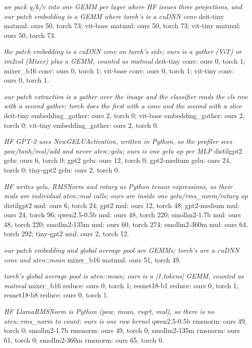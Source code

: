 \begin{minipage}{\linewidth}
\emph{we pack q/k/v into one GEMM per layer where HF issues three projections, and our patch embedding is a GEMM where torch's is a cuDNN conv} deit-tiny matmul: ours 50, torch 73; vit-base matmul: ours 50, torch 73; vit-tiny matmul: ours 50, torch 73.
\par\smallskip
\emph{the patch embedding is a cuDNN conv on torch's side; ours is a gather (ViT) or im2col (Mixer) plus a GEMM, counted as matmul} deit-tiny conv: ours 0, torch 1; mixer\_b16 conv: ours 0, torch 1; vit-base conv: ours 0, torch 1; vit-tiny conv: ours 0, torch 1.
\par\smallskip
\emph{our patch extraction is a gather over the image and the classifier reads the cls row with a second gather; torch does the first with a conv and the second with a slice} deit-tiny embedding\_gather: ours 2, torch 0; vit-base embedding\_gather: ours 2, torch 0; vit-tiny embedding\_gather: ours 2, torch 0.
\par\smallskip
\emph{HF GPT-2 uses NewGELUActivation, written in Python, so the profiler sees pow/tanh/mul/add and never aten::gelu; ours is one gelu op per MLP} distilgpt2 gelu: ours 6, torch 0; gpt2 gelu: ours 12, torch 0; gpt2-medium gelu: ours 24, torch 0; tiny-gpt2 gelu: ours 2, torch 0.
\par\smallskip
\emph{HF writes gelu, RMSNorm and rotary as Python tensor expressions, so their muls are individual aten::mul calls; ours are inside one gelu/rms\_norm/rotary op} distilgpt2 mul: ours 6, torch 24; gpt2 mul: ours 12, torch 48; gpt2-medium mul: ours 24, torch 96; qwen2.5-0.5b mul: ours 48, torch 220; smollm2-1.7b mul: ours 48, torch 220; smollm2-135m mul: ours 60, torch 274; smollm2-360m mul: ours 64, torch 292; tiny-gpt2 mul: ours 2, torch 12.
\par\smallskip
\emph{our patch embedding and global average pool are GEMMs; torch's are a cuDNN conv and aten::mean} mixer\_b16 matmul: ours 51, torch 49.
\par\smallskip
\emph{torch's global average pool is aten::mean; ours is a [1,tokens] GEMM, counted as matmul} mixer\_b16 reduce: ours 0, torch 1; resnet18-b1 reduce: ours 0, torch 1; resnet18-b8 reduce: ours 0, torch 1.
\par\smallskip
\emph{HF LlamaRMSNorm is Python (pow, mean, rsqrt, mul), so there is no aten::rms\_norm to count; ours is one row kernel} qwen2.5-0.5b rmsnorm: ours 49, torch 0; smollm2-1.7b rmsnorm: ours 49, torch 0; smollm2-135m rmsnorm: ours 61, torch 0; smollm2-360m rmsnorm: ours 65, torch 0.
\par\smallskip

\end{minipage}

